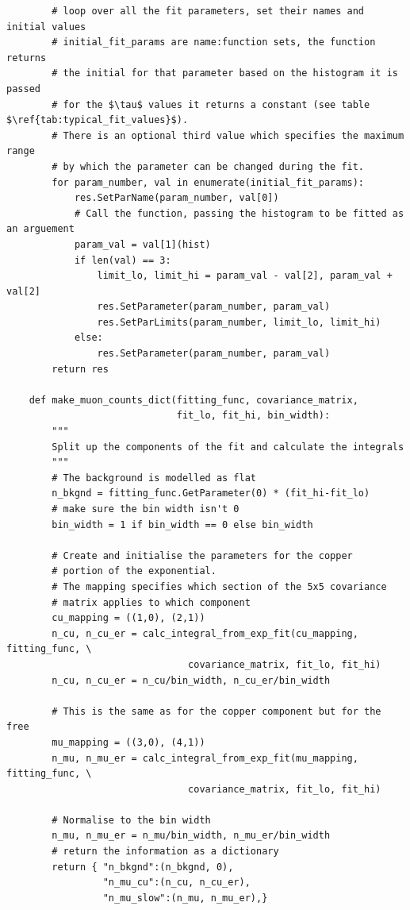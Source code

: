 \documentclass[]{article}
\begin{document}
\begin{verbatim}
        # loop over all the fit parameters, set their names and initial values
        # initial_fit_params are name:function sets, the function returns
        # the initial for that parameter based on the histogram it is passed
        # for the $\tau$ values it returns a constant (see table $\ref{tab:typical_fit_values}$).
        # There is an optional third value which specifies the maximum range
        # by which the parameter can be changed during the fit.
        for param_number, val in enumerate(initial_fit_params):
            res.SetParName(param_number, val[0])
            # Call the function, passing the histogram to be fitted as an arguement
            param_val = val[1](hist)
            if len(val) == 3:
                limit_lo, limit_hi = param_val - val[2], param_val + val[2] 
                res.SetParameter(param_number, param_val)
                res.SetParLimits(param_number, limit_lo, limit_hi)
            else:
                res.SetParameter(param_number, param_val)
        return res
        
    def make_muon_counts_dict(fitting_func, covariance_matrix, 
                              fit_lo, fit_hi, bin_width):
        """
        Split up the components of the fit and calculate the integrals
        """
        # The background is modelled as flat
        n_bkgnd = fitting_func.GetParameter(0) * (fit_hi-fit_lo) 
        # make sure the bin width isn't 0
        bin_width = 1 if bin_width == 0 else bin_width 

        # Create and initialise the parameters for the copper 
        # portion of the exponential.
        # The mapping specifies which section of the 5x5 covariance
        # matrix applies to which component
        cu_mapping = ((1,0), (2,1))
        n_cu, n_cu_er = calc_integral_from_exp_fit(cu_mapping, fitting_func, \
                                covariance_matrix, fit_lo, fit_hi)                            
        n_cu, n_cu_er = n_cu/bin_width, n_cu_er/bin_width

        # This is the same as for the copper component but for the free
        mu_mapping = ((3,0), (4,1))
        n_mu, n_mu_er = calc_integral_from_exp_fit(mu_mapping, fitting_func, \
                                covariance_matrix, fit_lo, fit_hi)
                                
        # Normalise to the bin width
        n_mu, n_mu_er = n_mu/bin_width, n_mu_er/bin_width
        # return the information as a dictionary
        return { "n_bkgnd":(n_bkgnd, 0), 
                 "n_mu_cu":(n_cu, n_cu_er), 
                 "n_mu_slow":(n_mu, n_mu_er),}


\end{verbatim}
\end{document}
